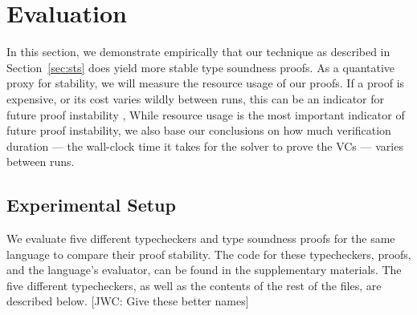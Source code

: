 \documentclass[sigplan,review,screen,anonymous]{acmart}
\newcommand{\comm}[3]{\textcolor{#1}{[#2: #3]}}
\newcommand{\jwc}[1]{\comm{dkgreen}{JWC}{#1}}
\begin{document}
\section{Evaluation}
\label{sec:eval}
In this section, we demonstrate empirically that our technique as described in Section~\ref{sec:sts}
does yield more stable type soundness proofs. As a quantative proxy for stability, we will measure
the resource usage of our proofs. If a proof is expensive, or its cost varies wildly
between runs, this can be an indicator for future proof instability \cite{stabilize},\cite{tomb}
While resource usage is the most important indicator of future proof instability, we also
base our conclusions on how much verification duration --- the wall-clock time it takes for the solver
to prove the VCs --- varies between runs.

\subsection*{Experimental Setup}
We evaluate five different typecheckers and type soundness proofs for the same
language to compare their proof stability.  The code for these typecheckers, proofs, and the language's evaluator, can be found in
the supplementary materials. The five different typecheckers, as well as the contents of the rest of the files, are described below.
\jwc{Give these better names}
\end{document}
